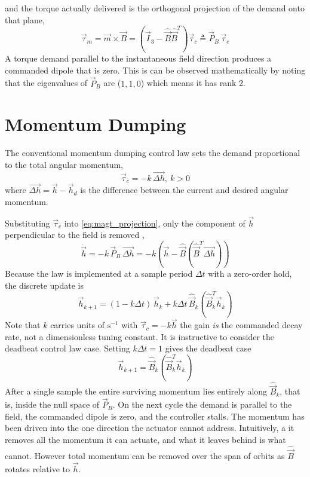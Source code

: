 and the torque actually delivered is the orthogonal projection of the demand onto that plane,
\begin{equation}
    \vec{\tau}_m = \vec{m} \times \vec{B} = \left(\vec{I}_3 - \hat{\vec{B}}\hat{\vec{B}}^T\right)\vec{\tau}_c \triangleq \vec{P}_B\,\vec{\tau}_c
    \label{eq:magt_projection}
\end{equation}
 A torque demand parallel to the instantaneous field direction produces a commanded dipole that is zero. This is can be observed mathematically by noting that the eigenvalues of $\vec{P}_B$ are ($1, 1, 0$) which means it has rank 2.
\section{Momentum Dumping}
\label{subsec:null_space_parking}
The conventional momentum dumping control law sets the demand proportional to the total angular momentum, 
\begin{equation}
    \vec{\tau}_c = -k\,\vec{\Delta h}, \ k > 0
    \label{eq:mag_dump_law}
\end{equation}
where $\vec{\Delta h} = \vec{h} - \vec{h}_d$ is the difference between the current and desired angular momentum.

Substituting $\vec{\tau}_c$ into \autoref{eq:magt_projection}, only the component of $\vec{h}$ perpendicular to the field is removed \cite{sidiAttitudeDynamicsKinematics1997},
\begin{equation}
    \dot{\vec{h}} = -k\,\vec{P}_B\,\vec{\Delta h} = -k\left(\vec{h} - \hat{\vec{B}}(\hat{\vec{B}}^T\vec{\Delta h})\right)
    \label{eq:dump_continuous}
\end{equation}
Because the law is implemented at a sample period $\Delta t$ with a zero-order hold, the discrete update is
\begin{equation}
    \vec{h}_{k+1} = (1 - k\Delta t)\,\vec{h}_k + k\Delta t\,\hat{\vec{B}}_k(\hat{\vec{B}}_k^T\vec{h}_k)
    \label{eq:dump_discrete}
\end{equation}
Note that $k$ carries units of $\mathrm{s}^{-1}$ with $\vec{\tau}_c = -k\vec{h}$ the gain \emph{is} the commanded decay rate, not a dimensionless tuning constant. It is instructive to consider the deadbeat control law case. Setting $k\Delta t = 1$ gives the deadbeat case
\begin{equation}
    \vec{h}_{k+1} = \hat{\vec{B}}_k(\hat{\vec{B}}_k^T\vec{h}_k)
\end{equation}
After a single sample the entire surviving momentum lies entirely along $\hat{\vec{B}}_k$, that is, inside the null space of $\vec{P}_B$. On the next cycle the demand is parallel to the field, the commanded dipole is zero, and the controller stalls. The momentum has been driven into the one direction the actuator cannot address. Intuitively, a it removes all the momentum it can actuate, and what it leaves behind is what cannot. However total momentum can be removed over the span of orbits as $\hat{\vec{B}}$ rotates relative to $\vec{h}$. 

